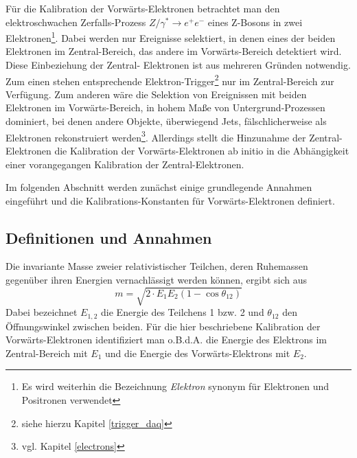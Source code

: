 
Für die Kalibration der Vorwärts-Elektronen betrachtet man den elektroschwachen
Zerfalls-Prozess $Z/\gamma^* \rightarrow e^+e^-$ eines Z-Bosons in zwei
Elektronen\footnote{Es wird weiterhin die Bezeichnung \textit{Elektron}
synonym für Elektronen und Positronen verwendet}. Dabei werden nur
Ereignisse selektiert, in denen eines der beiden Elektronen im Zentral-Bereich,
das andere im Vorwärts-Bereich detektiert wird. Diese Einbeziehung der Zentral-
Elektronen ist aus mehreren Gründen notwendig. Zum einen stehen entsprechende
Elektron-Trigger\footnote{siehe hierzu Kapitel
\ref{trigger_daq}}
nur im Zentral-Bereich zur Verfügung. Zum anderen wäre die Selektion von
Ereignissen mit beiden Elektronen im Vorwärts-Bereich, in hohem Maße von
Untergrund-Prozessen dominiert, bei denen andere Objekte, überwiegend Jets,
fälschlicherweise als Elektronen rekonstruiert werden\footnote{vgl. Kapitel
\ref{electrons}}.
Allerdings stellt die Hinzunahme der Zentral-Elektronen die Kalibration der
Vorwärts-Elektronen ab initio in die Abhängigkeit einer vorangegangen 
Kalibration der Zentral-Elektronen.

Im folgenden Abschnitt werden zunächst einige grundlegende Annahmen eingeführt
und die Kalibrations-Konstanten für Vorwärts-Elektronen definiert.



\subsection{Definitionen und Annahmen}
\label{energy_calibration:definitionen_und_annahmen}

Die invariante Masse zweier relativistischer Teilchen, deren Ruhemassen
gegenüber ihren Energien vernachlässigt werden können, ergibt sich aus
\begin{equation}
    \label{invariant_mass:basic}
    m = \sqrt{ 2 \cdot E_1 E_2 (1-\cos\theta_{12}) }
\end{equation}
Dabei bezeichnet $E_{1,2}$ die Energie des Teilchens 1 bzw. 2 und $\theta_{12}$
den Öffnungswinkel zwischen beiden. Für die hier beschriebene Kalibration der
Vorwärts-Elektronen identifiziert man o.B.d.A. die Energie des Elektrons im
Zentral-Bereich mit $E_1$ und die Energie des Vorwärts-Elektrons mit $E_2$.

